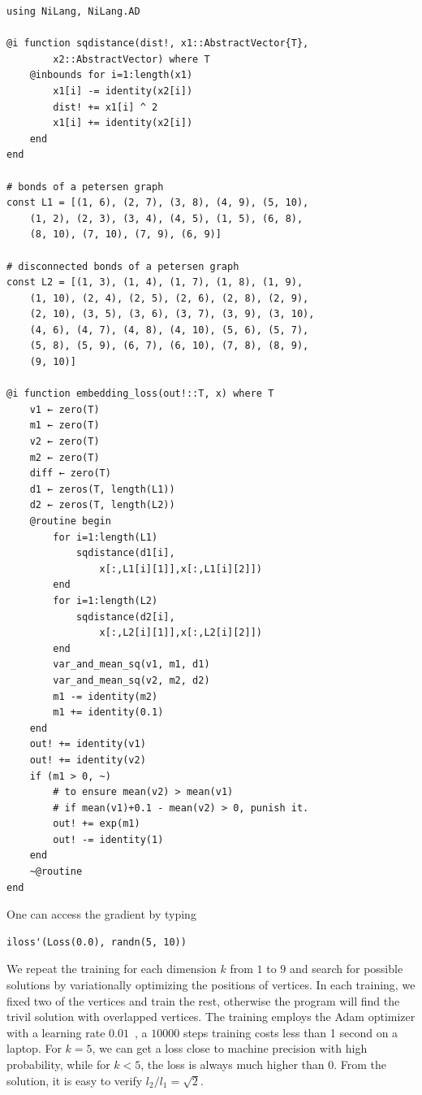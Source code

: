 \documentclass[aps,twocolumn,longbibliography,english,superscriptaddress]{revtex4-1}
\newcommand{\<}{\langle}
\renewcommand{\>}{\rangle}
\theoremstyle{definition}\newtheorem{definition}{\textit{Definition}}
\begin{document}
\begin{minipage}{.44\textwidth}
\begin{lstlisting}
using NiLang, NiLang.AD

@i function sqdistance(dist!, x1::AbstractVector{T},
        x2::AbstractVector) where T
    @inbounds for i=1:length(x1)
        x1[i] -= identity(x2[i])
        dist! += x1[i] ^ 2
        x1[i] += identity(x2[i])
    end
end

# bonds of a petersen graph
const L1 = [(1, 6), (2, 7), (3, 8), (4, 9), (5, 10),
    (1, 2), (2, 3), (3, 4), (4, 5), (1, 5), (6, 8),
    (8, 10), (7, 10), (7, 9), (6, 9)]

# disconnected bonds of a petersen graph
const L2 = [(1, 3), (1, 4), (1, 7), (1, 8), (1, 9),
    (1, 10), (2, 4), (2, 5), (2, 6), (2, 8), (2, 9),
    (2, 10), (3, 5), (3, 6), (3, 7), (3, 9), (3, 10),
    (4, 6), (4, 7), (4, 8), (4, 10), (5, 6), (5, 7),
    (5, 8), (5, 9), (6, 7), (6, 10), (7, 8), (8, 9),
    (9, 10)]

@i function embedding_loss(out!::T, x) where T
    v1 ← zero(T)
    m1 ← zero(T)
    v2 ← zero(T)
    m2 ← zero(T)
    diff ← zero(T)
    d1 ← zeros(T, length(L1))
    d2 ← zeros(T, length(L2))
    @routine begin
        for i=1:length(L1)
            sqdistance(d1[i], 
                x[:,L1[i][1]],x[:,L1[i][2]])
        end
        for i=1:length(L2)
            sqdistance(d2[i],
                x[:,L2[i][1]],x[:,L2[i][2]])
        end
        var_and_mean_sq(v1, m1, d1)
        var_and_mean_sq(v2, m2, d2)
        m1 -= identity(m2)
        m1 += identity(0.1)
    end
    out! += identity(v1)
    out! += identity(v2)
    if (m1 > 0, ~)
        # to ensure mean(v2) > mean(v1)
        # if mean(v1)+0.1 - mean(v2) > 0, punish it.
        out! += exp(m1)
        out! -= identity(1)
    end
    ~@routine
end
\end{lstlisting}
\end{minipage}

One can access the gradient by typing

\begin{minipage}{.44\textwidth}
\begin{lstlisting}
iloss'(Loss(0.0), randn(5, 10))
\end{lstlisting}
\end{minipage}

We repeat the training for each dimension $k$ from $1$ to $9$ and search for possible solutions by variationally optimizing the positions of vertices.
In each training, we fixed two of the vertices and train the rest, otherwise the program will find the trivil solution with overlapped vertices. 
The training employs the Adam optimizer with a learning rate $0.01$~\cite{Kingma2014}, a $10000$ steps training costs less than 1 second on a laptop. For $k=5$, we can get a loss close to machine precision with high probability, while for $k < 5$, the loss is always much higher than $0$.
From the solution, it is easy to verify $l_2/l_1 = \sqrt{2}$.
\end{document}
